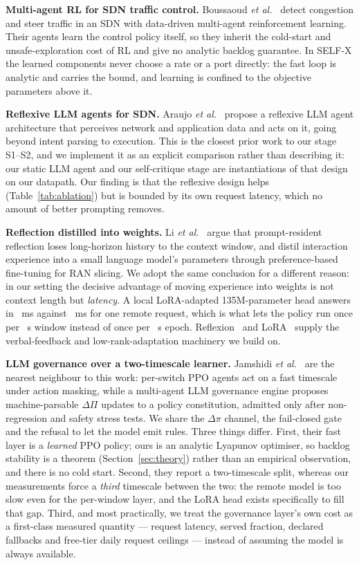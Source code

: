 \documentclass[conference]{IEEEtran}
\newcommand{\dpi}{\Delta\pi}
\begin{document}
\textbf{Multi-agent RL for SDN traffic control.} Boussaoud \emph{et
al.}~\cite{boussaoud2025marl} detect congestion and steer traffic in an SDN with
data-driven multi-agent reinforcement learning. Their agents learn the control
policy itself, so they inherit the cold-start and unsafe-exploration cost of RL
and give no analytic backlog guarantee. In SELF-X the learned components never
choose a rate or a port directly: the fast loop is analytic and carries the bound,
and learning is confined to the objective parameters above it.

\textbf{Reflexive LLM agents for SDN.} Araujo \emph{et
al.}~\cite{araujo2024agentic} propose a reflexive LLM agent architecture that
perceives network and application data and acts on it, going beyond intent parsing
to execution. This is the closest prior work to our stage S1--S2, and we implement
it as an explicit comparison rather than describing it: our static LLM agent and
our self-critique stage are instantiations of that design on our datapath. Our
finding is that the reflexive design helps (Table~\ref{tab:ablation}) but is
bounded by its own request latency, which no amount of better prompting removes.

\textbf{Reflection distilled into weights.} Li \emph{et al.}~\cite{li2026redsi}
argue that prompt-resident reflection loses long-horizon history to the context
window, and distil interaction experience into a small language model's parameters
through preference-based fine-tuning for RAN slicing. We adopt the same conclusion
for a different reason: in our setting the decisive advantage of moving experience
into weights is not context length but \emph{latency}. A local LoRA-adapted
135M-parameter head answers in \ResThreeCtrl~ms against \ResLLMLatency~ms for one
remote request, which is what lets the policy run once per \ResWindowSec~s window
instead of once per \ResEpochSec~s epoch. Reflexion~\cite{shinn2023reflexion} and
LoRA~\cite{hu2022lora} supply the verbal-feedback and low-rank-adaptation
machinery we build on.

\textbf{LLM governance over a two-timescale learner.} Jamshidi \emph{et
al.}~\cite{jamshidi2026governance} are the nearest neighbour to this work: per-switch
PPO agents act on a fast timescale under action masking, while a multi-agent LLM
governance engine proposes machine-parsable $\Delta\Pi$ updates to a policy
constitution, admitted only after non-regression and safety stress tests. We share
the $\dpi$ channel, the fail-closed gate and the refusal to let the model emit
rules. Three things differ. First, their fast layer is a \emph{learned} PPO policy;
ours is an analytic Lyapunov optimiser, so backlog stability is a theorem
(Section~\ref{sec:theory}) rather than an empirical observation, and there is no
cold start. Second, they report a two-timescale split, whereas our measurements
force a \emph{third} timescale between the two: the remote model is too slow even
for the per-window layer, and the LoRA head exists specifically to fill that gap.
Third, and most practically, we treat the governance layer's own cost as a
first-class measured quantity --- request latency, served fraction, declared
fallbacks and free-tier daily request ceilings --- instead of assuming the model is
always available.
\end{document}
